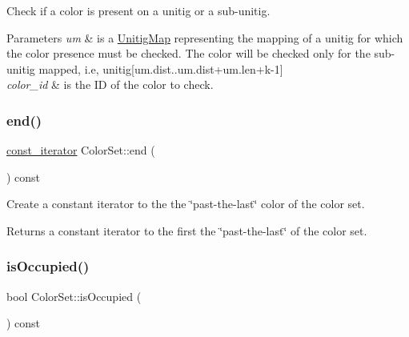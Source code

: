 Check if a color is present on a unitig or a sub-\/unitig. 


\begin{DoxyParams}{Parameters}
{\em um} & is a \hyperlink{structUnitigMap}{Unitig\+Map} representing the mapping of a unitig for which the color presence must be checked. The color will be checked only for the sub-\/unitig mapped, i.\+e, unitig\mbox{[}um.\+dist..um.\+dist+um.len+k-\/1\mbox{]} \\
\hline
{\em color\+\_\+id} & is the ID of the color to check. \\
\hline
\end{DoxyParams}
\mbox{\label{classColorSet_a1cbf01ea772e3318644c95a6d95348fd}} 
\subsubsection{\texorpdfstring{end()}{end()}}
{\footnotesize\ttfamily \hyperlink{classColorSet_1_1ColorSet__const__iterator}{const\+\_\+iterator} Color\+Set\+::end (\begin{DoxyParamCaption}{ }\end{DoxyParamCaption}) const\hspace{0.3cm}{\ttfamily [inline]}}



Create a constant iterator to the the \char`\"{}past-\/the-\/last\char`\"{} color of the color set. 

\begin{DoxyReturn}{Returns}
a constant iterator to the first the \char`\"{}past-\/the-\/last\char`\"{} of the color set. 
\end{DoxyReturn}
\mbox{\label{classColorSet_a509c260d1561a341600783c08ff7692e}} 
\subsubsection{\texorpdfstring{is\+Occupied()}{isOccupied()}}
{\footnotesize\ttfamily bool Color\+Set\+::is\+Occupied (\begin{DoxyParamCaption}{ }\end{DoxyParamCaption}) const\hspace{0.3cm}{\ttfamily [inline]}}



